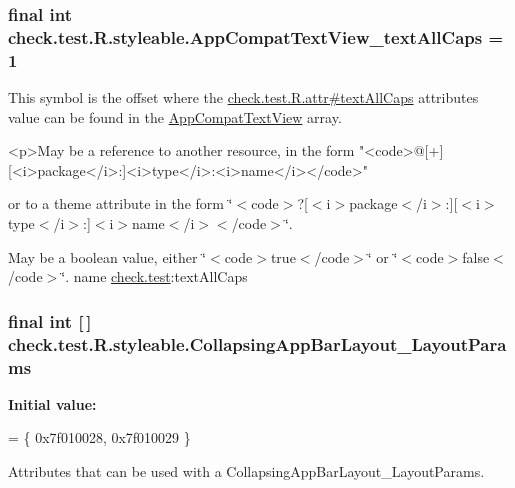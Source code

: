 \subsubsection[{App\+Compat\+Text\+View\+\_\+text\+All\+Caps}]{\setlength{\rightskip}{0pt plus 5cm}final int check.\+test.\+R.\+styleable.\+App\+Compat\+Text\+View\+\_\+text\+All\+Caps = 1\hspace{0.3cm}{\ttfamily [static]}}\label{classcheck_1_1test_1_1_r_1_1styleable_aafcec9edff038010ef0a530321a8dea1}
This symbol is the offset where the \hyperlink{classcheck_1_1test_1_1_r_1_1attr_a09d1fb38439d083ce88110c7038a7949}{check.\+test.\+R.\+attr\#text\+All\+Caps} attribute\textquotesingle{}s value can be found in the \hyperlink{classcheck_1_1test_1_1_r_1_1styleable_a07bf5a828a4906262f29b961bc851581}{App\+Compat\+Text\+View} array.

\begin{DoxyVerb}      <p>May be a reference to another resource, in the form "<code>@[+][<i>package</i>:]<i>type</i>:<i>name</i></code>"
\end{DoxyVerb}
 or to a theme attribute in the form \char`\"{}$<$code$>$?\mbox{[}$<$i$>$package$<$/i$>$\+:\mbox{]}\mbox{[}$<$i$>$type$<$/i$>$\+:\mbox{]}$<$i$>$name$<$/i$>$$<$/code$>$\char`\"{}. 

May be a boolean value, either \char`\"{}$<$code$>$true$<$/code$>$\char`\"{} or \char`\"{}$<$code$>$false$<$/code$>$\char`\"{}.  name \hyperlink{namespacecheck_1_1test}{check.\+test}\+:text\+All\+Caps \hypertarget{classcheck_1_1test_1_1_r_1_1styleable_a7e768556a62ed1c95f1a007062d82336}{}
\subsubsection[{Collapsing\+App\+Bar\+Layout\+\_\+\+Layout\+Params}]{\setlength{\rightskip}{0pt plus 5cm}final int \mbox{[}$\,$\mbox{]} check.\+test.\+R.\+styleable.\+Collapsing\+App\+Bar\+Layout\+\_\+\+Layout\+Params\hspace{0.3cm}{\ttfamily [static]}}\label{classcheck_1_1test_1_1_r_1_1styleable_a7e768556a62ed1c95f1a007062d82336}
{\bfseries Initial value\+:}
\begin{DoxyCode}
= \{
            0x7f010028, 0x7f010029
        \}
\end{DoxyCode}
Attributes that can be used with a Collapsing\+App\+Bar\+Layout\+\_\+\+Layout\+Params. 

